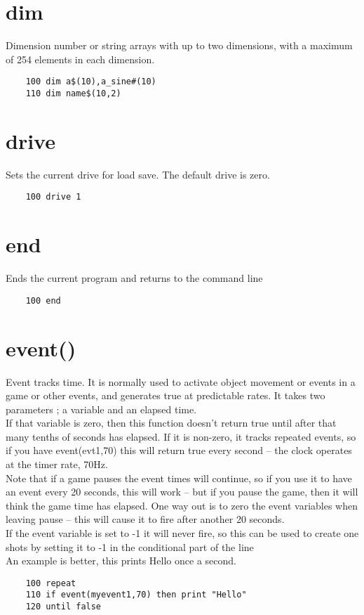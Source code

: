 \section*{dim}
Dimension number or string arrays with up to two dimensions, with a maximum of 254 elements in each dimension.
\example{}
\begin{verbatim}
	100 dim a$(10),a_sine#(10)
	110 dim name$(10,2)
\end{verbatim}

\section*{drive}
Sets the current drive for load save. The default drive is zero.
\example{}
\begin{verbatim}
	100 drive 1
\end{verbatim}

\section*{end}
Ends the current program and returns to the command line
\example{}
\begin{verbatim}
	100 end
\end{verbatim}

\section*{event()}
Event tracks time. It is normally used to activate object movement or events in a game or other events, and generates true at predictable rates. It takes two parameters ; a variable and an elapsed time.\\
If that variable is zero, then this function doesn’t return true until after that many tenths of seconds has elapsed. If it is non-zero, it tracks repeated events, so if you have event(evt1,70) this will return true every second – the clock operates at the timer rate, 70Hz.\\
Note that if a game pauses the event times will continue, so if you use it to have an event every 20 seconds, this will work – but if you pause the game, then it will think the game time has elapsed. One way out is to zero the event variables when leaving pause – this will cause it to fire after another 20 seconds. \\
If the event variable is set to -1 it will never fire, so this can be used to create one shots by setting it to -1 in the conditional part of the line\\
An example is better, this prints Hello once a second.
\example{}
\begin{verbatim}
	100 repeat
	110 if event(myevent1,70) then print "Hello"
	120 until false
\end{verbatim}

